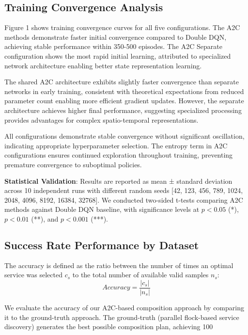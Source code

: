 \documentclass[10pt,twocolumn]{article}
\begin{document}
\subsection{Training Convergence Analysis}\label{training-convergence-analysis}

Figure 1 shows training convergence curves for all five configurations.
The A2C methods demonstrate faster initial convergence compared to
Double DQN, achieving stable performance within 350-500 episodes.
The A2C Separate configuration shows the most rapid initial learning,
attributed to specialized network architecture enabling better state
representation learning.

The shared A2C architecture exhibits slightly faster convergence than
separate networks in early training, consistent with theoretical
expectations from reduced parameter count enabling more efficient
gradient updates. However, the separate architecture achieves higher
final performance, suggesting specialized processing provides advantages
for complex spatio-temporal representations.

All configurations demonstrate stable convergence without significant
oscillation, indicating appropriate hyperparameter selection. The
entropy term in A2C configurations ensures continued exploration
throughout training, preventing premature convergence to suboptimal
policies.

\textbf{Statistical Validation}: Results are reported as mean ± standard
deviation across 10 independent runs with different random seeds {[}42,
123, 456, 789, 1024, 2048, 4096, 8192, 16384, 32768{]}. We conducted
two-sided t-tests comparing A2C methods against Double DQN baseline,
with significance levels at $p < 0.05$ (*), $p < 0.01$ (**), and $p < 0.001$ (***).

\subsection{Success Rate Performance by Dataset}\label{success-rate-performance-by-dataset}

The accuracy is defined as the ratio between the number of times an optimal service was selected $c_s$ to the total number of available valid samples $n_s$:
\[Accuracy = \frac{|c_s|}{|n_s|}\]

We evaluate the accuracy of our A2C-based composition approach by comparing it to the ground-truth approach. The ground-truth (parallel flock-based service discovery) generates the best possible composition plan, achieving 100%
\end{document}
